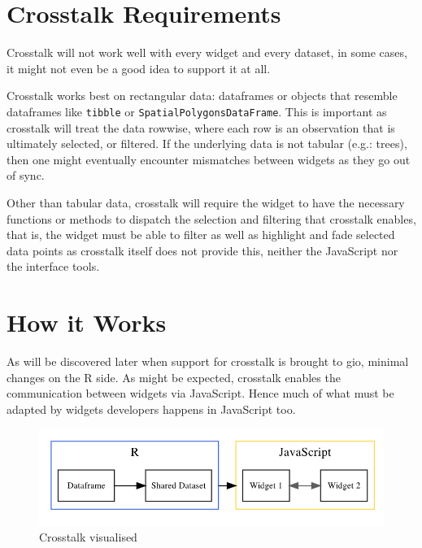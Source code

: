 \documentclass[10pt,]{krantz}
\begin{document}
\hypertarget{linking-widgets-req}{%
\section{Crosstalk Requirements}\label{linking-widgets-req}}

Crosstalk will not work well with every widget and every dataset, in some cases, it might not even be a good idea to support it at all.

Crosstalk works best on rectangular data: dataframes or objects that resemble dataframes like \texttt{tibble} or \texttt{SpatialPolygonsDataFrame}. This is important as crosstalk will treat the data rowwise, where each row is an observation that is ultimately selected, or filtered. If the underlying data is not tabular (e.g.: trees), then one might eventually encounter mismatches between widgets as they go out of sync.

Other than tabular data, crosstalk will require the widget to have the necessary functions or methods to dispatch the selection and filtering that crosstalk enables, that is, the widget must be able to filter as well as highlight and fade selected data points as crosstalk itself does not provide this, neither the JavaScript nor the interface tools.

\hypertarget{linking-widgets-inner-workings}{%
\section{How it Works}\label{linking-widgets-inner-workings}}

As will be discovered later when support for crosstalk is brought to gio, minimal changes on the R side. As might be expected, crosstalk enables the communication between widgets via JavaScript. Hence much of what must be adapted by widgets developers happens in JavaScript too.

\begin{figure}[H]

{\centering \includegraphics[width=1\linewidth]{images/03-crosstalk-viz} 

}

\caption{Crosstalk visualised}\label{fig:crosstalk-diagram}
\end{figure}
\end{document}
